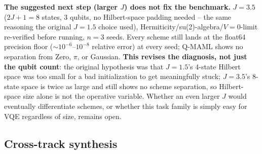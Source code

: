 \documentclass[11pt]{article}
\begin{document}
\begin{keyresult}
\textbf{The suggested next step (larger $J$) does not fix the benchmark.} $J{=}3.5$ ($2J{+}1{=}8$ states,
3 qubits, no Hilbert-space padding needed -- the same reasoning the original $J{=}1.5$ choice used),
Hermiticity/su(2)-algebra/$V{=}0$-limit re-verified before running, $n{=}3$ seeds. Every scheme still lands
at the float64 precision floor ($\sim10^{-6}$--$10^{-8}$ relative error) at every seed; Q-MAML shows no
separation from Zero, $\pi$, or Gaussian. \textbf{This revises the diagnosis, not just the qubit count}: the
original hypothesis was that $J{=}1.5$'s 4-state Hilbert space was too small for a bad initialization to get
meaningfully stuck; $J{=}3.5$'s 8-state space is twice as large and still shows no scheme separation, so
Hilbert-space size alone is not the operative variable. Whether an even larger $J$ would eventually
differentiate schemes, or whether this task family is simply easy for VQE regardless of size, remains open.
\end{keyresult}

\FloatBarrier
\subsection{Cross-track synthesis}
\label{sec:cross-track}
\end{document}
